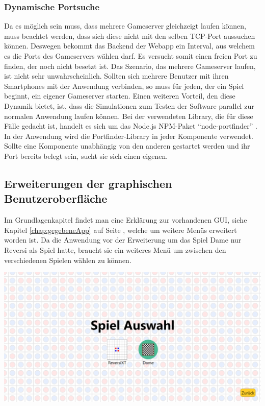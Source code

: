 \documentclass[12pt,a4paper,bibliography=totocnumbered,listof=totocnumbered]{article}
\begin{document}
\subsubsection{Dynamische Portsuche}
Da es möglich sein muss, dass mehrere Gameserver gleichzeigt laufen können, muss beachtet werden, dass sich diese nicht mit den selben \ac{TCP}-Port aussuchen können.
Deswegen bekommt das Backend der Webapp ein Interval, aus welchem es die Ports des Gameservers wählen darf. Es versucht somit einen freien Port zu finden, der noch nicht 
besetzt ist. Das Szenario, das mehrere Gameserver laufen, ist nicht sehr unwahrscheinlich. Sollten sich mehrere Benutzer mit ihren Smartphones mit der Anwendung verbinden,
so muss für jeden, der ein Spiel beginnt, ein eigener Gameserver starten. Einen weiteren Vorteil, den diese Dynamik bietet, ist, dass die Simulationen 
zum Testen der Software parallel zur normalen Anwendung laufen können. Bei der verwendeten Library, die für diese Fälle gedacht ist, handelt es sich um 
das Node.js NPM-Paket ``node-portfinder'' \cite{portfinder}. In der Anwendung wird die Portfinder-Library in jeder Komponente verwendet. Sollte 
eine Komponente unabhängig von den anderen gestartet werden und ihr Port bereits belegt sein, sucht sie sich einen eigenen.

\subsection{Erweiterungen der graphischen Benutzeroberfläche}
Im Grundlagenkapitel findet man eine Erklärung zur vorhandenen \ac{GUI}, siehe Kapitel \ref{chap:gegebeneApp} auf Seite \pageref{chap:gegebeneApp}, welche 
um weitere Menüs erweitert worden ist. Da die Anwendung vor der Erweiterung um das Spiel Dame nur Reversi als Spiel hatte, 
braucht sie ein weiteres Menü um zwischen den verschiedenen Spielen wählen zu können.

\vspace{1em}
\begin{minipage}{\linewidth}
	\centering
	\includegraphics[width=0.7\linewidth]{pics/GameSelectionScreen.png}
	\label{fig:GameSelectionScreen}
\end{minipage}
\\
\end{document}
